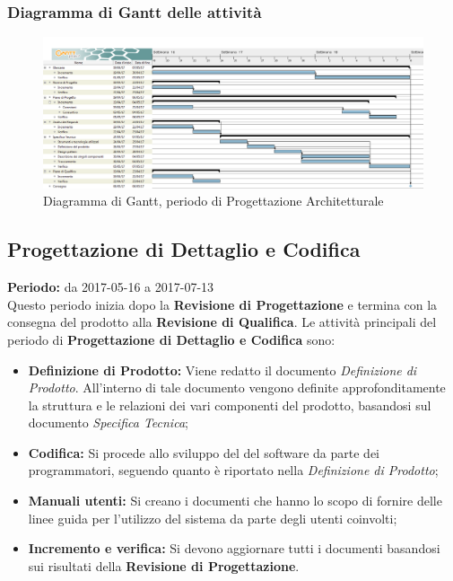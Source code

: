 	\subsubsection{Diagramma di Gantt delle attività}
	\begin{figure}[H]
		\centering
		\includegraphics[width=1\linewidth]{immagini/gantt/progettazione_architetturale.png}
		\caption{Diagramma di Gantt, periodo di Progettazione Architetturale}
	\end{figure}
	\subsection{Progettazione di Dettaglio e Codifica}
	\textbf{Periodo:} da 2017-05-16 a 2017-07-13 \\
	Questo periodo inizia dopo la \textbf{Revisione di Progettazione} e termina con la consegna del prodotto alla \textbf{Revisione di Qualifica}. Le attività principali del periodo di \textbf{Progettazione di Dettaglio e Codifica} sono: \\
	\begin{itemize}
		\item \textbf{Definizione di Prodotto:} Viene redatto il documento \textit{Definizione di Prodotto}. All'interno di tale documento vengono definite approfonditamente la struttura e le relazioni dei vari componenti del prodotto, basandosi sul documento \textit{Specifica Tecnica};
		\item \textbf{Codifica:} Si procede allo sviluppo del  del software da parte dei programmatori, seguendo quanto è riportato nella \textit{Definizione di Prodotto};
		\item \textbf{Manuali utenti:} Si creano i documenti che hanno lo scopo di fornire delle linee guida per l'utilizzo del sistema da parte degli utenti coinvolti;
		\item \textbf{Incremento e verifica:} Si devono aggiornare tutti i documenti basandosi sui risultati della \textbf{Revisione di Progettazione}. \\
	\end{itemize}
